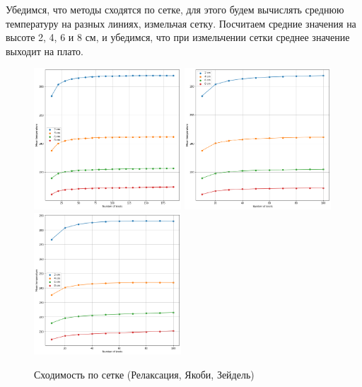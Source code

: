\documentclass[20pt]{article}
\begin{document}
    \newpage
    Убедимся, что методы сходятся по сетке, для этого будем вычислять среднюю температуру на разных линиях, измельчая сетку. Посчитаем средние значения на высоте 2, 4, 6 и 8 см, и убедимся, что при измельчении сетки среднее значение выходит на плато.
    \begin{figure}[h!]
        \centering
        \includegraphics[width=55mm]{mean_hor.png}
        \includegraphics[width=55mm]{mean_hor_2.png}
        \includegraphics[width=55mm]{mean_hor_3.png}
        \caption{Сходимость по сетке (Релаксация, Якоби, Зейдель)}
        \label{setup}
    \end{figure}
\end{document}
